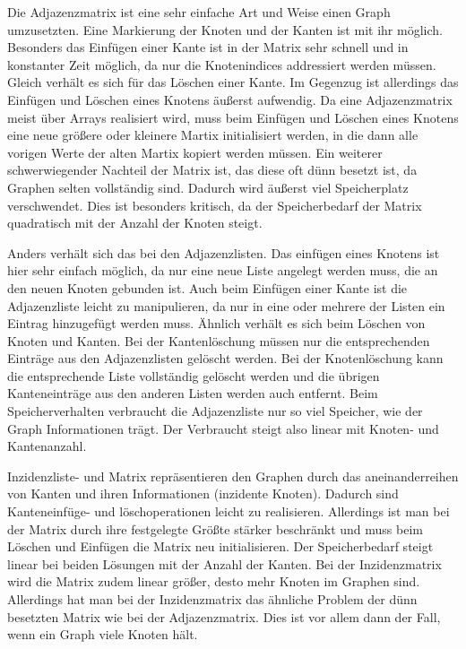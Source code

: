 \documentclass[a4paper,12pt,ngerman,chapterprefix=false,listof=totoc,bibliography=totoc]{scrreprt}
\begin{document}
{{{Die Adjazenzmatrix ist eine sehr einfache Art und Weise einen Graph umzusetzten. Eine Markierung der Knoten und der Kanten ist mit ihr möglich. Besonders das Einfügen einer Kante ist in der Matrix sehr schnell und in konstanter Zeit möglich, da nur die Knotenindices addressiert werden müssen. Gleich verhält es sich für das Löschen einer Kante. Im Gegenzug ist allerdings das Einfügen und Löschen eines Knotens äußerst aufwendig. Da eine Adjazenzmatrix meist über Arrays realisiert wird, muss beim Einfügen und Löschen eines Knotens eine neue größere oder kleinere Martix initialisiert werden, in die dann alle vorigen Werte der alten Martix kopiert werden müssen. Ein weiterer schwerwiegender Nachteil der Matrix ist, das diese oft dünn besetzt ist, da Graphen selten vollständig sind. Dadurch wird äußerst viel Speicherplatz verschwendet. Dies ist besonders kritisch, da der Speicherbedarf der Matrix quadratisch mit der Anzahl der Knoten steigt.

Anders verhält sich das bei den Adjazenzlisten. Das einfügen eines Knotens ist hier sehr einfach möglich, da nur eine neue Liste angelegt werden muss, die an den neuen Knoten gebunden ist. Auch beim Einfügen einer Kante ist die Adjazenzliste leicht zu manipulieren, da nur in eine oder mehrere der Listen ein Eintrag hinzugefügt werden muss. Ähnlich verhält es sich beim Löschen von Knoten und Kanten. Bei der Kantenlöschung müssen nur die entsprechenden Einträge aus den Adjazenzlisten gelöscht werden. Bei der Knotenlöschung kann die entsprechende Liste vollständig gelöscht werden und die übrigen Kanteneinträge aus den anderen Listen werden auch entfernt. Beim Speicherverhalten verbraucht die Adjazenzliste nur so viel Speicher, wie der Graph Informationen trägt. Der Verbraucht steigt also linear mit Knoten- und Kantenanzahl.

Inzidenzliste- und Matrix repräsentieren den Graphen durch das aneinanderreihen von Kanten und ihren Informationen (inzidente Knoten). Dadurch sind Kanteneinfüge- und löschoperationen leicht zu realisieren. Allerdings ist man bei der Matrix durch ihre festgelegte Größte stärker beschränkt und muss beim Löschen und Einfügen die Matrix neu initialisieren. Der Speicherbedarf steigt linear bei beiden Lösungen mit der Anzahl der Kanten. Bei der Inzidenzmatrix wird die Matrix zudem linear größer, desto mehr Knoten im Graphen sind. Allerdings hat man bei der Inzidenzmatrix das ähnliche Problem der dünn besetzten Matrix wie bei der Adjazenzmatrix. Dies ist vor allem dann der Fall, wenn ein Graph viele Knoten hält.

}}}
\end{document}
